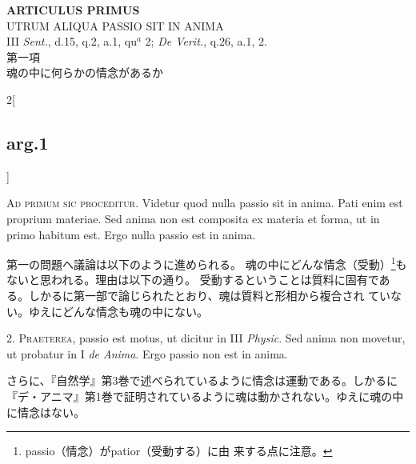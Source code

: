 \documentclass[paper=a4paper,fontsize=10pt,jafontsize=9pt,titlepage]{jlreq}
\begin{document}
\newpage
{}
{}
\setcounter{section}{1}
\setcounter{subsection}{0}

\begin{center}
 {\Large {\bfseries ARTICULUS PRIMUS}}\\
 {\large UTRUM ALIQUA PASSIO SIT IN ANIMA}\\
 {\footnotesize III {\itshape Sent.}, d.15, q.2, a.1, qu${^a}$ 2; {\itshape
 De Verit.}, q.26, a.1, 2.}\\
 {\Large 第一項\\魂の中に何らかの情念があるか}
\end{center}

\begin{paracol}{2}[\subsection{arg.1}]

{\scshape Ad primum sic proceditur}. Videtur quod nulla passio sit in
 anima. Pati enim est proprium materiae. Sed anima non est composita ex
 materia et forma, ut in primo habitum est. Ergo nulla passio est in
 anima.

\switchcolumn

第一の問題へ議論は以下のように進められる。
魂の中にどんな情念（受動）\footnote{passio（情念）がpatior（受動する）に由
 来する点に注意。}もないと思われる。理由は以下の通り。
受動するということは質料に固有である。しかるに第一部で論じられたとおり、魂は質料と形相から複合され
 ていない。ゆえにどんな情念も魂の中にない。


2. {\scshape Praeterea}, passio est motus, ut dicitur in III {\itshape Physic}. Sed anima non
 movetur, ut probatur in I {\itshape de Anima}. Ergo passio non est in
 anima.

\switchcolumn

さらに、『自然学』第3巻で述べられているように情念は運動である。しかるに
 『デ・アニマ』第1巻で証明されているように魂は動かされない。ゆえに魂の中
 に情念はない。



\end{paracol}
\end{document}
